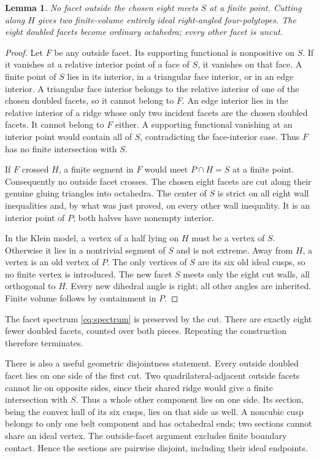 \documentclass[11pt]{article}
\newtheorem{lemma}[theorem]{Lemma}
\theoremstyle{remark}
\begin{document}
\begin{lemma}\label{lem:cut}
No facet outside the chosen eight meets $S$ at a finite point.
Cutting along $H$ gives two finite-volume entirely ideal
right-angled four-polytopes. The eight doubled facets become
ordinary octahedra; every other facet is uncut.
\end{lemma}
\begin{proof}
Let $F$ be any outside facet. Its supporting functional is
nonpositive on $S$. If it vanishes at a relative interior point
of a face of $S$, it vanishes on that face. A finite point of $S$
lies in its interior, in a triangular face interior, or in an
edge interior. A triangular face interior belongs to the relative
interior of one of the chosen doubled facets, so it cannot belong
to $F$. An edge interior lies in the relative interior of a ridge
whose only two incident facets are the chosen doubled facets.
It cannot belong to $F$ either. A supporting functional vanishing
at an interior point would contain all of $S$, contradicting the
face-interior case. Thus $F$ has no finite intersection with $S$.

If $F$ crossed $H$, a finite segment in $F$ would meet
$P\cap H=S$ at a finite point. Consequently no outside facet
crosses. The chosen eight facets are cut along their genuine
gluing triangles into octahedra. The center of $S$ is strict on
all eight wall inequalities and, by what was just proved, on
every other wall inequality. It is an interior point of $P$;
both halves have nonempty interior.

In the Klein model, a vertex of a half lying on $H$ must be a
vertex of $S$. Otherwise it lies in a nontrivial segment of $S$
and is not extreme. Away from $H$, a vertex is an old vertex of
$P$. The only vertices of $S$ are its six old ideal cusps, so
no finite vertex is introduced. The new facet $S$ meets only the
eight cut walls, all orthogonal to $H$. Every new dihedral angle
is right; all other angles are inherited. Finite volume follows
by containment in $P$.
\end{proof}

The facet spectrum \eqref{eq:spectrum} is preserved by the cut.
There are exactly eight fewer doubled facets, counted over both
pieces. Repeating the construction therefore terminates.

There is also a useful geometric disjointness statement. Every
outside doubled facet lies on one side of the first cut. Two
quadrilateral-adjacent outside facets cannot lie on opposite
sides, since their shared ridge would give a finite intersection
with $S$. Thus a whole other component lies on one side. Its
section, being the convex hull of its six cusps, lies on that
side as well. A noncubic cusp belongs to only one belt component
and has octahedral ends; two sections cannot share an ideal
vertex. The outside-facet argument excludes finite boundary
contact. Hence the sections are pairwise disjoint, including
their ideal endpoints.
\end{document}
